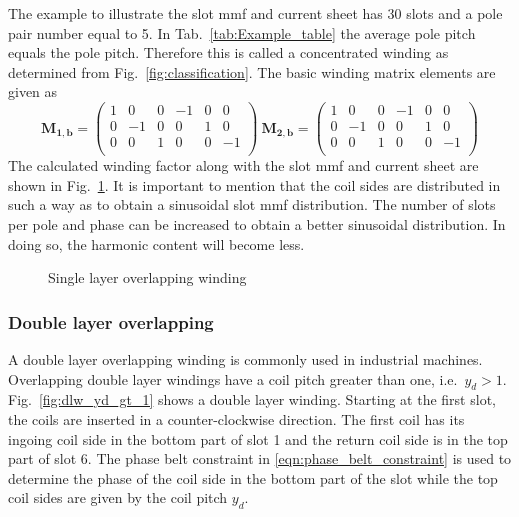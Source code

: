 The example to illustrate the slot mmf and current sheet has 30 slots and a pole pair number equal to 5. In Tab.~\ref{tab:Example_table} the average pole pitch equals the pole pitch. Therefore this is called a concentrated winding as determined from Fig.~\ref{fig:classification}. The basic winding matrix elements are given as
\begin{equation}
  \mathbf{M_{1,b}} = 
  \begin{pmatrix}
  1&0&0&-1&0&0\\    
  0&-1&0&0&1&0\\   
  0&0&1&0&0&-1\\   
  \end{pmatrix} \
  \mathbf{M_{2,b}} = 
  \begin{pmatrix}
  1& 0&0&-1&0&0\\
  0&-1&0& 0&1&0\\
  0& 0&1& 0&0&-1\\  
  \end{pmatrix} 
\end{equation}
The calculated winding factor along with the slot mmf and current sheet are shown in Fig.~\ref{fig:Main_single_overlapping}. It is important to mention that the coil sides are distributed in such a way as to obtain a sinusoidal slot mmf distribution. The number of slots per pole and phase can be increased to obtain a better sinusoidal distribution. In doing so, the harmonic content will become less.
\begin{figure}[htbp]
	\centering
	
	\vspace{1cm}
	
	\caption{Single layer overlapping winding}
	\label{fig:Main_single_overlapping}
\end{figure}

\subsubsection{Double layer overlapping}
A double layer overlapping winding is commonly used in industrial machines. Overlapping double layer windings have a coil pitch greater than one, i.e.~$y_d>1$. Fig.~\ref{fig:dlw_yd_gt_1} shows a double layer winding. Starting at the first slot, the coils are inserted in a counter-clockwise direction. The first coil has its ingoing coil side in the bottom part of slot 1 and the return coil side is in the top part of slot 6. The phase belt constraint in \eqref{eqn:phase_belt_constraint} is used to determine the phase of the coil side in the bottom part of the slot while the top coil sides are given by the coil pitch $y_d$.

